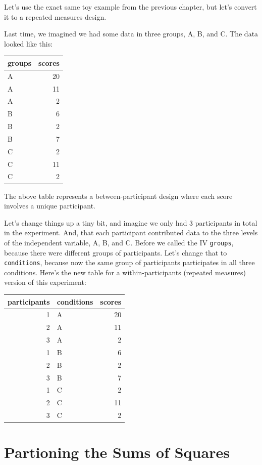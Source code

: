 \documentclass[
]{book}
\begin{document}
Let's use the exact same toy example from the previous chapter, but let's convert it to a repeated measures design.

Last time, we imagined we had some data in three groups, A, B, and C. The data looked like this:

\begin{tabular}[t]{l|r}
\hline
groups & scores\\
\hline
A & 20\\
\hline
A & 11\\
\hline
A & 2\\
\hline
B & 6\\
\hline
B & 2\\
\hline
B & 7\\
\hline
C & 2\\
\hline
C & 11\\
\hline
C & 2\\
\hline
\end{tabular}

The above table represents a between-participant design where each score involves a unique participant.

Let's change things up a tiny bit, and imagine we only had 3 participants in total in the experiment. And, that each participant contributed data to the three levels of the independent variable, A, B, and C. Before we called the IV \texttt{groups}, because there were different groups of participants. Let's change that to \texttt{conditions}, because now the same group of participants participates in all three conditions. Here's the new table for a within-participants (repeated measures) version of this experiment:

\begin{tabular}[t]{r|l|r}
\hline
participants & conditions & scores\\
\hline
1 & A & 20\\
\hline
2 & A & 11\\
\hline
3 & A & 2\\
\hline
1 & B & 6\\
\hline
2 & B & 2\\
\hline
3 & B & 7\\
\hline
1 & C & 2\\
\hline
2 & C & 11\\
\hline
3 & C & 2\\
\hline
\end{tabular}

\section{Partioning the Sums of Squares}\label{partioning-the-sums-of-squares}
\end{document}

